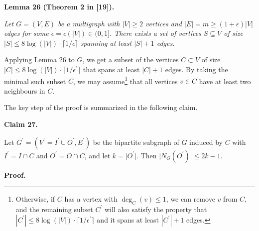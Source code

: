 \documentclass[10pt,a4paper]{article}
\begin{document}


\par\medskip\noindent\textbf{
\textbf{Lemma 26}\textbf{ }(Theorem 2 in [19])\textbf{.}
}\par



\emph{Let $G=(V,E)$ be a multigraph with $\lvert V\rvert\geq 2$ vertices and $\lvert E\rvert=m\geq(1+\epsilon)\lvert V\rvert$ edges for some $\epsilon=\epsilon(\lvert V\rvert)\in(0,1]$. There exists a set of vertices $S\subseteq V$ of size $|S|\leq 8\log(\lvert V\rvert)\cdot\lceil 1/\epsilon\rceil$ spanning at least $|S|+1$ edges.}\par






Applying Lemma 26 to $G$, we get a subset of the vertices $C\subset V$ of size $|C|\leq 8\log(\lvert V\rvert)\cdot\lceil 1/\epsilon^{\prime}\rceil$ that spans at least $|C|+1$ edges.
By taking the minimal such subset $C$, we may assume\footnote{Otherwise, if $C$ has a vertex with $\deg_{C}(v)\leq 1$, we can remove $v$ from $C$, and the remaining subset $C^{\prime}$ will also satisfy the property that
$|C^{\prime}|\leq 8\log(\lvert V\rvert)\cdot\lceil 1/\epsilon^{\prime}\rceil$ and it spans at least $|C^{\prime}|+1$ edges.} that all vertices $v\in C$ have at least two neighbours in $C$.\par




The key step of the proof is summarized in the following claim.\par





\par\medskip\noindent\textbf{
Claim 27. 
}\par



Let $G^{\prime}=(V^{\prime}=I^{\prime}\cup O^{\prime},E^{\prime})$ be the bipartite subgraph of $G$ induced by $C$ with $I^{\prime}=I\cap C$ and $O^{\prime}=O\cap C$, and let $k=\lvert O^{\prime}\rvert$. Then $\lvert N_{G}(O^{\prime})\rvert\leq 2k-1$.\par







\par\medskip\noindent\textbf{
\textbf{Proof}.}\par
\end{document}

